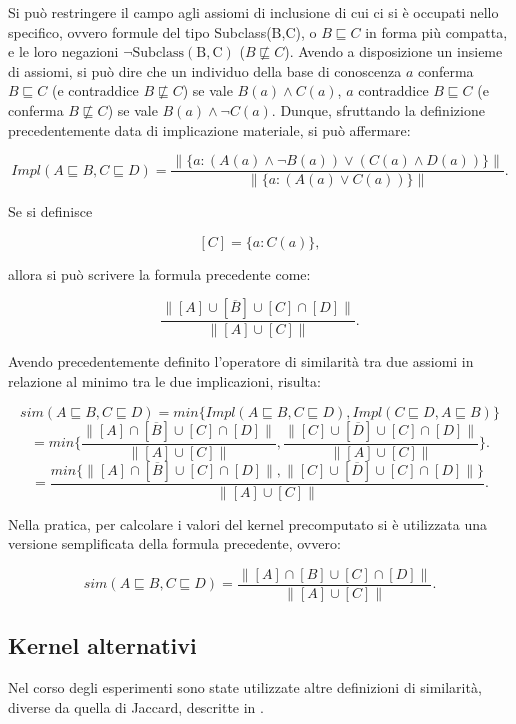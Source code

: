\documentclass[12pt,a4paper]{report}
\begin{document}
Si può restringere il campo agli assiomi di inclusione di cui ci si è occupati nello specifico, ovvero formule del tipo Subclass(B,C), o 	$B \sqsubseteq C$ in forma più compatta, e le loro negazioni \emph{ $\lnot \mathrm{Subclass(B,C)}$} ({$ B \not\sqsubseteq C$}).
Avendo a disposizione un insieme di assiomi, si può dire che un individuo della base di conoscenza $a$ conferma $B \sqsubseteq C$ (e contraddice  {$ B \not\sqsubseteq C$}) se vale $B(a) \land C(a)$, $a$ contraddice  $B \sqsubseteq C$ (e conferma {$ B \not\sqsubseteq C$}) se vale $B(a) \land \lnot C(a)$.
Dunque, sfruttando la definizione precedentemente data di implicazione materiale, si può affermare:

\[Impl(A \sqsubseteq B, C \sqsubseteq D) = \frac{\parallel \{ a: (A(a) \land \lnot B(a)) \lor (C(a) \land D(a)) \} \parallel}{\parallel \{ a: (A(a) \lor C(a))\} \parallel}. \]

Se si definisce

\[ [C] = \{a : C(a) \},\]

allora si può scrivere la formula precedente come:

\[ \frac{\parallel [A] \cup [\overline{B}] \cup [C] \cap [D] \parallel}{\parallel [A] \cup [C] \parallel}.\]

Avendo precedentemente definito l'operatore di similarità tra due assiomi in relazione al minimo tra le due implicazioni, risulta:

\[ sim(A \sqsubseteq B, C  \sqsubseteq D) = min\{Impl(A \sqsubseteq B, C\sqsubseteq D), Impl( C\sqsubseteq D, A \sqsubseteq B)\} \]
\[ = min\bigg\{\frac{\parallel [A] \cap [\overline{B}] \cup [C] \cap [D] \parallel}{\parallel [A] \cup [C] \parallel}, \frac{\parallel [C] \cup [\overline{D}] \cup [C] \cap [D] \parallel}{\parallel [A] \cup [C] \parallel}\bigg\}.\]
\[ = \frac{min\{\parallel [A] \cap [\overline{B}] \cup [C] \cap [D] \parallel, \parallel [C] \cup [\overline{D}] \cup [C] \cap [D] \parallel\}}{\parallel [A] \cup [C] \parallel}.\]

Nella pratica, per calcolare i valori del kernel precomputato si è utilizzata una versione semplificata della formula precedente, ovvero:

\[sim(A \sqsubseteq B, C  \sqsubseteq D) = \frac{\parallel [A] \cap [B] \cup [C] \cap [D] \parallel}{\parallel [A] \cup [C] \parallel}. \]


\subsection{Kernel alternativi}
Nel corso degli esperimenti sono state utilizzate altre definizioni di similarità, diverse da quella di Jaccard, descritte in \cite{drtpaper}.
\end{document}
